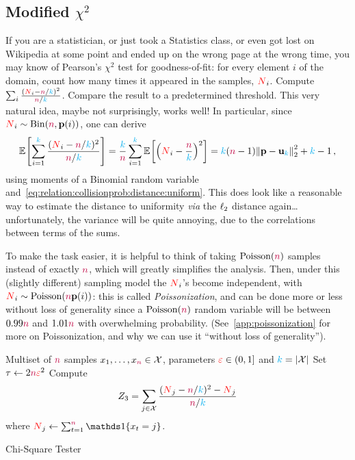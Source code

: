 \subsection{Modified $\chi^2$}
  \label{ssec:uniformity:chisquare}  If you are a statistician, or just took a Statistics class, or even got lost on Wikipedia at some point and ended up on the wrong page at the wrong time, you may know of Pearson's $\chi^2$ test for goodness-of-fit: for every element $i$ of the domain, count how many times it appeared in the samples, $\occur_i$. Compute $\sum_{i} \frac{(\occur_i-\ns/\ab)^2}{\ns/\ab}$. Compare the result to a predetermined threshold. This very natural idea, maybe not surprisingly, works well! In particular, since $\occur_i \sim \binomial{\ns}{\p(i)}$, one can derive
\[
\bEE{ \sum_{i=1}^\ab \frac{(\occur_i-\ns/\ab)^2}{\ns/\ab} } = \frac{\ab}{\ns}\sum_{i=1}^\ab \bEE{ \Paren{\occur_i-\frac{\ns}{\ab}}^2 } = \ab(\ns-1)\normtwo{\p-\uniform_\ab}^2 + \ab-1\,,
\]
using moments of a Binomial random variable and~\cref{eq:relation:collisionprob:distance:uniform}. This does look like a reasonable way to estimate the distance to uniformity \emph{via} the $\lp[2]$ distance again\dots{} unfortunately, the variance will be quite annoying, due to the correlations between terms of the sums.

To make the task easier, it is helpful to think of taking $\poisson{\ns}$ samples instead of exactly $\ns$, which will greatly simplifies the analysis. Then, under this (slightly different) sampling model the $\occur_i$'s become independent, with $\occur_i\sim\poisson{\ns\p(i)}$: this is called \emph{Poissonization}, and can be done more or less without loss of generality since a $\poisson{\ns}$ random variable will be between $0.99\ns$ and $1.01\ns$ with overwhelming probability. (See~\cref{app:poissonization} for more on Poissonization, and why we can use it ``without loss of generality'').

\begin{algorithm}[ht!]
  \begin{algorithmic}[1]
    \Require Multiset of $\ns$ samples $x_1,\dots,x_\ns \in \domain$, parameters $\dst\in(0,1]$ and $\ab = \abs{\domain}$
    \State Set $\tau \gets 2\ns\dst^2$
    \State Compute 
    \[
        Z_3 = \sum_{j\in\domain} \frac{(\occur_j-\ns/\ab)^2-\occur_j}{\ns/\ab}
    \] where $\occur_j \gets \sum_{t=1}^\ns\indic{x_t=j}$.
     \Return \reject {}
    \Else\ 
      \Return \accept {}
    \EndIf
  \end{algorithmic}
  \caption{\label{algo:chisquare}\sc Chi-Square Tester}
\end{algorithm}

